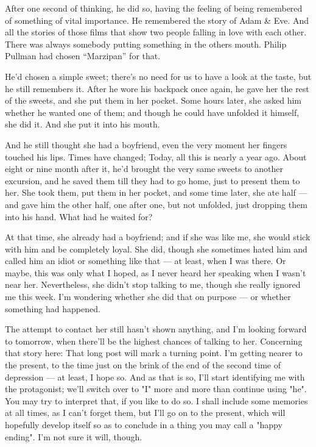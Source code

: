 After one second of thinking, he did so, having the feeling of being remembered of something of vital importance. 
He remembered the story of Adam \& Eve. 
And all the stories of those films that show two people falling in love with each other. 
There was always somebody putting something in the others mouth. 
Philip Pullman had chosen \enquote{Marzipan} for that.

He'd chosen a simple sweet; there's no need for us to have a look at the taste, but he still remembers it. 
After he wore his backpack once again, he gave her the rest of the sweets, and she put them in her pocket. 
Some hours later, she asked him whether he wanted one of them; and though he could have unfolded it himself, she did it. 
And she put it into his mouth.

And he still thought she had a boyfriend, even the very moment her fingers touched his lips. 
Times have changed; Today, all this is nearly a year ago. About eight or nine month after it, he'd brought the very same sweets to another excursion, and he saved them till they had to go home, just to present them to her. 
She took them, put them in her pocket, and some time later, she ate half --- and gave him the other half, one after one, but not unfolded, just dropping them into his hand. 
What had he waited for?

At that time, she already had a boyfriend; and if she was like me, she would stick with him and be completely loyal. 
She did, though she sometimes hated him and called him an idiot or something like that --- at least, when I was there. 
Or maybe, this was only what I hoped, as I never heard her speaking when I wasn't near her. 
Nevertheless, she didn't stop talking to me, though she really ignored me this week. 
I'm wondering whether she did that on purpose --- or whether something had happened.

The attempt to contact her still hasn't shown anything, and I'm looking forward to tomorrow, when there'll be the highest chances of talking to her. 
Concerning that story here: That long post will mark a turning point. I'm getting nearer to the present, to the time just on the brink of the end of the second time of depression --- at least, I hope so. And as that is so, I'll start identifying me with the protagonist; we'll switch over to "I" more and more than continue using "he". You may try to interpret that, if you like to do so. 
I shall include some memories at all times, as I can't forget them, but I'll go on to the present, which will hopefully develop itself so as to conclude in a thing you may call a "happy ending". 
I'm not sure it will, though.

